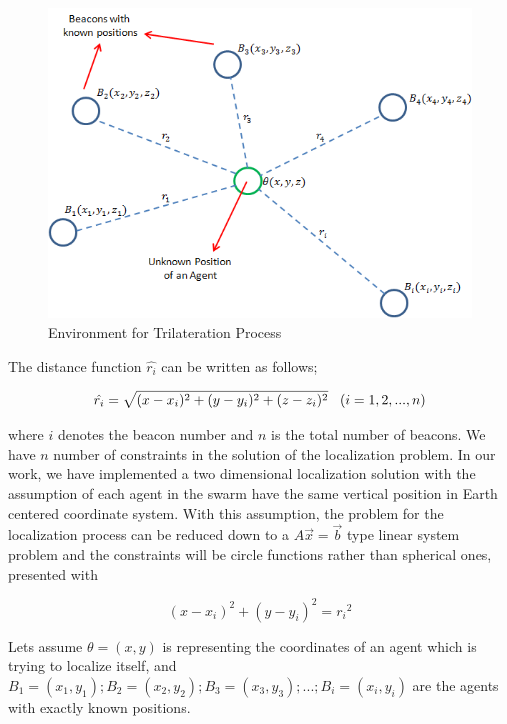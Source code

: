 \begin{figure}[H] \label{beacons}
\caption{Environment for Trilateration Process}
\centering
\includegraphics[scale = 0.65]{beacons}
\end{figure}

The distance function $\hat{r_i}$ can be written as follows;

\begin{equation} %
\hat{r_i} = \sqrt{(x-x_i)^2 + (y-y_i)^2+ (z-z_i)^2}    \hspace{0.3cm}   (i=1,2,...,n)
\end{equation}

where $i$ denotes the beacon number and $n$ is the total number of beacons. We have $n$ number of constraints in the solution of the localization problem. In our work, we have implemented a two dimensional localization solution with the assumption of each agent in the swarm have the same vertical position in Earth centered coordinate system. With this assumption, the problem for the localization process can be reduced down to a $A\vec{x} =\vec{b} $ type linear system problem and the constraints will be circle functions rather than spherical ones, presented with

\begin{equation}
(x-x_i)^2 + (y - y_i)^2 = {r_i}^2
\end{equation}

Lets assume $\theta = (x,y)$ is representing the coordinates of an agent which is trying to localize itself, and $B_1 = (x_1,y_1) ; B_2 = (x_2,y_2) ; B_3 = (x_3,y_3) ; ...  ; B_i = (x_i,y_i)$ are the agents with exactly known positions.

